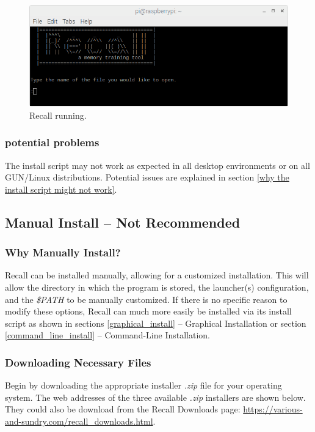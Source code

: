 \documentclass[letterpaper]{article}
\begin{document}
  \begin{figure}[H]
    \centering
    \includegraphics[width=14cm]{images/command_line_install/recall_running.png}
    \caption{Recall running.}
    \label{fig:recall_first_invoked}
  \end{figure}

\subsubsection{potential problems}
The install script may not work as expected in all desktop environments or on all GUN/Linux distributions. Potential issues are explained in section \ref{why the install script might not work}.

\subsection{Manual Install -- Not Recommended}
\subsubsection{Why Manually Install?}
Recall can be installed manually, allowing for a customized installation. This will allow the directory in which the program is stored, the launcher(s) configuration, and the \textit{\$PATH} to be manually customized. If there is no specific reason to modify these options, Recall can much more easily be installed via its install script as shown in sections \ref{graphical_install} -- Graphical Installation or section \ref{command_line_install} -- Command-Line Installation.

\subsubsection{Downloading Necessary Files}
Begin by downloading the appropriate installer \textit{.zip} file for your operating system. The web addresses of the three available \textit{.zip} installers are shown below. They could also be download from the Recall Downloads page: \href{https://various-and-sundry.com/recall_downloads.html}{https://various-and-sundry.com/recall\_downloads.html}.
\end{document}
